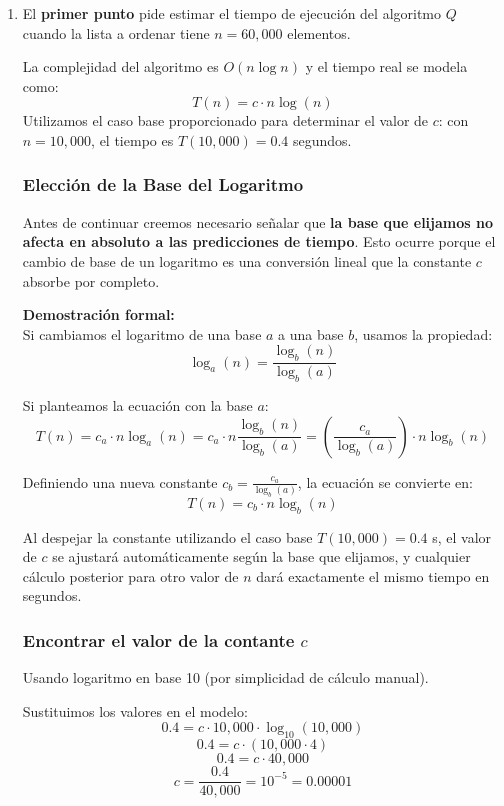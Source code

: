 \begin{enumerate}
    \item 
    El \textbf{primer punto} pide estimar el tiempo de ejecución del algoritmo $Q$ cuando la lista a ordenar tiene $n = 60,000$ elementos.

    La complejidad del algoritmo es $O(n \log n)$ y el tiempo real se modela como:
    $$T(n) = c \cdot n \log(n)$$
    Utilizamos el caso base proporcionado para determinar el valor de $c$: con $n = 10,000$, el tiempo es $T(10,000) = 0.4$ segundos. 

    \subsubsection*{Elección de la Base del Logaritmo}

    Antes de continuar creemos necesario señalar que \textbf{la base que elijamos no afecta en absoluto a las predicciones de tiempo}. Esto ocurre porque el cambio de base de un logaritmo es una conversión lineal que la constante $c$ absorbe por completo.
    
    \textbf{Demostración formal:}\\
    Si cambiamos el logaritmo de una base $a$ a una base $b$, usamos la propiedad:
    $$\log_a(n) = \frac{\log_b(n)}{\log_b(a)}$$
    
    Si planteamos la ecuación con la base $a$:
    $$T(n) = c_a \cdot n \log_a(n) = c_a \cdot n \frac{\log_b(n)}{\log_b(a)} = \left( \frac{c_a}{\log_b(a)} \right) \cdot n \log_b(n)$$
    
    Definiendo una nueva constante $c_b = \frac{c_a}{\log_b(a)}$, la ecuación se convierte en:
    $$T(n) = c_b \cdot n \log_b(n)$$
    
    Al despejar la constante utilizando el caso base $T(10,000) = 0.4$ s, el valor de $c$ se ajustará automáticamente según la base que elijamos, y cualquier cálculo posterior para otro valor de $n$ dará exactamente el mismo tiempo en segundos.

    \subsubsection*{Encontrar el valor de la contante $c$}

    Usando logaritmo en base 10 (por simplicidad de cálculo manual).

    Sustituimos los valores en el modelo:
    $$0.4 = c \cdot 10,000 \cdot \log_{10}(10,000)$$
    $$0.4 = c \cdot (10,000 \cdot 4)$$
    $$0.4 = c \cdot 40,000$$
    $$c = \frac{0.4}{40,000} = 10^{-5} = 0.00001$$
    

\end{enumerate}
